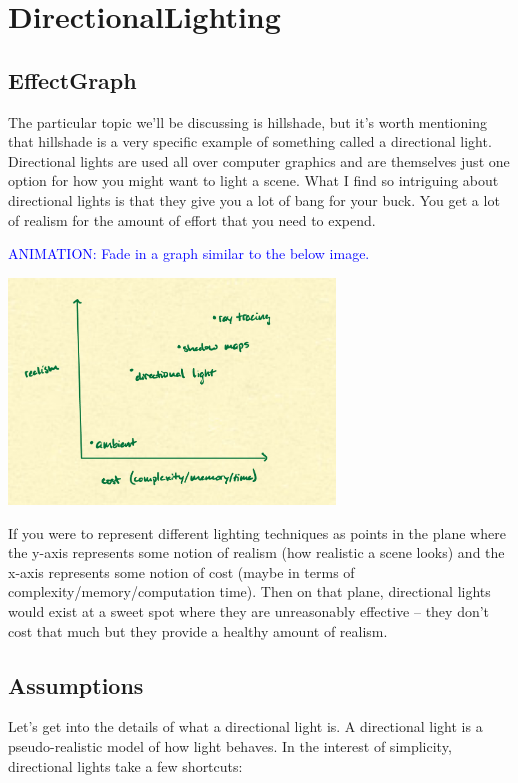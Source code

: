 \documentclass{article}
\newcommand\animation[1]{\textcolor{blue}{ANIMATION: #1}}
\begin{document}
\section{DirectionalLighting}

\subsection{EffectGraph}

The particular topic we'll be discussing is hillshade, but it's worth mentioning that hillshade is a very specific example of something called a directional light.
Directional lights are used all over computer graphics and are themselves just one option for how you might want to light a scene.
What I find so intriguing about directional lights is that they give you a lot of bang for your buck.
You get a lot of realism for the amount of effort that you need to expend.

\animation{Fade in a graph similar to the below image.}

\begin{center}
	\includegraphics[width=0.65\textwidth,frame]{assets/realism.jpg}
\end{center}

If you were to represent different lighting techniques as points in the plane where the y-axis represents some notion of realism (how realistic a scene looks) and the x-axis represents some notion of cost (maybe in terms of complexity/memory/computation time).
Then on that plane, directional lights would exist at a sweet spot where they are unreasonably effective -- they don't cost that much but they provide a healthy amount of realism.

\subsection{Assumptions}

Let's get into the details of what a directional light is.
A directional light is a pseudo-realistic model of how light behaves.
In the interest of simplicity, directional lights take a few shortcuts:
\end{document}

